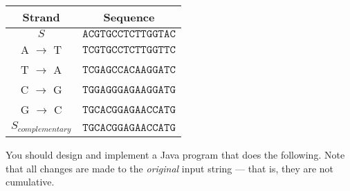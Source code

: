 \documentclass[11pt]{article}
\begin{document}
\begin{center}

\begin{tabular}{|cc|}
\hline
\textbf{Strand} & \textbf{Sequence}\\
\hline\hline
$S$      & $\mathtt{ACGTGCCTCTTGGTAC}$ \\
\hline
A $\to$ T &  $\mathtt{TCGTGCCTCTTGGTTC}$ \\
T $\to$ A &  $\mathtt{TCGAGCCACAAGGATC}$ \\
C $\to$ G &  $\mathtt{TGGAGGGAGAAGGATG}$ \\
G $\to$ C &  $\mathtt{TGCACGGAGAACCATG}$ \\
\hline
$S_{complementary}$ &  $\mathtt{TGCACGGAGAACCATG}$ \\
\hline
\end{tabular}
\end{center}

You should design and implement a Java program that does the following.  Note
that all changes are made to the {\em original} input string --- that is, they
are not cumulative.
\end{document}
